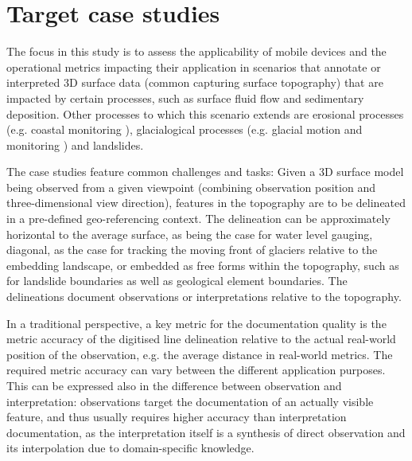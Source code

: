 \documentclass[review]{elsarticle}
\begin{document}
\section{Target case studies}
\label{sec:case_studies}

The focus in this study is to assess the applicability of mobile devices and the operational metrics impacting their application in scenarios that annotate or interpreted 3D surface data (common capturing surface topography) that are impacted by certain processes, such as surface fluid flow and sedimentary deposition. Other processes to which this scenario extends are erosional processes (e.g. coastal monitoring \cite{Letortu2017, Medjkane2018}), glacialogical processes (e.g. glacial motion and monitoring \cite{Schwalbe2017b}) and landslides.

The case studies feature common challenges and tasks: Given a 3D surface model being observed from a given viewpoint (combining observation position and three-dimensional view direction), features in the topography are to be delineated  in a pre-defined geo-referencing context. The delineation can be approximately horizontal to the average surface, as being the case for water level gauging, diagonal, as the case for tracking the moving front of glaciers relative to the embedding landscape, or embedded as free forms within the topography, such as for landslide boundaries as well as geological element boundaries. The delineations document observations or interpretations relative to the topography.

In a traditional perspective, a key metric for the documentation quality is the metric accuracy of the digitised line delineation relative to the actual real-world position of the observation, e.g. the average distance in real-world metrics. The required metric accuracy can vary between the different application purposes. This can be expressed also in the difference between observation and interpretation: observations target the documentation of an actually visible feature, and thus usually requires higher accuracy than interpretation documentation, as the interpretation itself is a synthesis of direct observation and its interpolation due to domain-specific knowledge.
\end{document}
